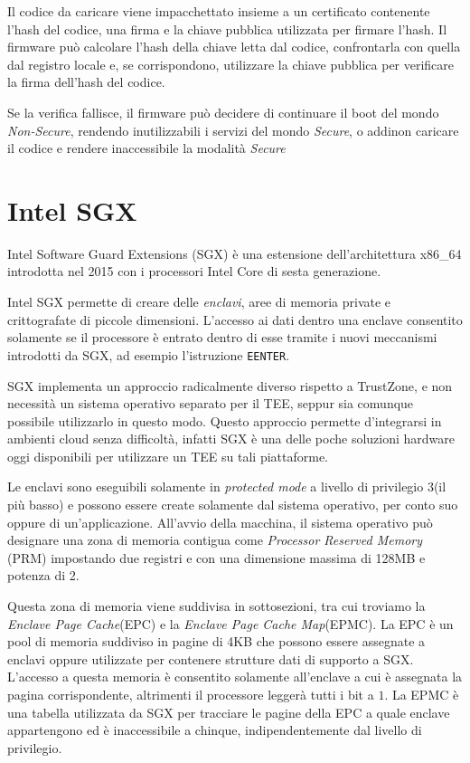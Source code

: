 \documentclass[12pt,italian]{report}
\begin{document}
Il codice da caricare viene impacchettato insieme a un certificato
contenente l'hash del codice, una firma e la chiave pubblica utilizzata
per firmare l'hash.
Il firmware può calcolare l'hash della chiave letta dal codice, confrontarla
con quella dal registro locale e, se corrispondono, utilizzare la
chiave pubblica per verificare la firma dell'hash del codice.

Se la verifica fallisce, il firmware può decidere di continuare il boot
del mondo \emph{Non-Secure}, rendendo inutilizzabili i servizi del mondo
\emph{Secure}, o addinon caricare il codice
e rendere inaccessibile la modalità \emph{Secure}

\section{Intel SGX}
\label{sec:intel-sgx}
Intel Software Guard Extensions (SGX) è una estensione
dell'architettura x86\_64 introdotta nel 2015 con i processori
Intel Core di sesta generazione.

Intel SGX permette di creare delle \textit{enclavi}, aree di
memoria private e crittografate di piccole dimensioni.
L'accesso ai dati dentro una enclave consentito solamente se
il processore è entrato dentro di esse tramite i nuovi meccanismi
introdotti da SGX, ad esempio l'istruzione \texttt{EENTER}.

SGX implementa un approccio radicalmente diverso rispetto a TrustZone, e
non necessità un sistema operativo separato per il TEE, seppur sia comunque
possibile utilizzarlo in questo modo.
Questo approccio permette d'integrarsi in ambienti cloud senza difficoltà,
infatti SGX è una delle poche soluzioni hardware oggi disponibili
per utilizzare un TEE su tali piattaforme.

Le enclavi sono eseguibili solamente in \textit{protected mode}
a livello di privilegio $3$(il più basso) e possono essere create
solamente dal sistema operativo, per conto suo oppure di un'applicazione.
All'avvio della macchina, il sistema operativo può designare una zona
di memoria contigua come \textit{Processor Reserved Memory} (PRM) impostando
due registri e con una dimensione massima di 128MB e potenza di 2.

Questa zona di memoria viene suddivisa in sottosezioni, tra cui troviamo
la \textit{Enclave Page Cache}(EPC) e la
\textit{Enclave Page Cache Map}(EPMC).
La EPC è un pool di memoria suddiviso in pagine di 4KB che possono essere
assegnate a enclavi oppure utilizzate per contenere strutture dati di
supporto a SGX.
L'accesso a questa memoria è consentito solamente all'enclave a cui è
assegnata la pagina corrispondente, altrimenti il processore leggerà tutti
i bit a $1$.
La EPMC è una tabella utilizzata da SGX per tracciare le pagine della EPC
a quale enclave appartengono ed è inaccessibile a chinque, indipendentemente
dal livello di privilegio.
\end{document}
